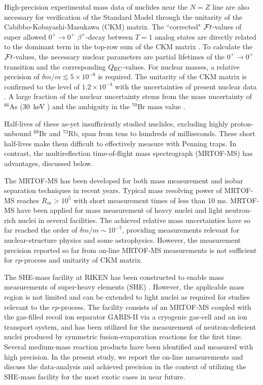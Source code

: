 \documentclass[3p]{elsarticle}
\begin{document}
High-precision experimental mass data of nuclides near the $N=Z$ line are also necessary for verification of the Standard Model through the unitarity of the Cabibbo-Kobayashi-Masukawa (CKM) matrix. The ``corrected" ${\cal F}t$-values of super allowed $0^{+} \rightarrow 0^{+}$ $\beta^{+}$-decay between $T = 1$ analog states are directly related to the dominant term in the top-row sum of the CKM matrix \citep{Towner2010}. To calculate the ${\cal F}t$-values, the necessary nuclear parameters are partial lifetimes of the $0^{+} \rightarrow 0^{+}$ transition  and the corresponding $Q_{\rm EC}$-values. For nuclear masses, a relative precision of $\delta m/m \lesssim 5 \times 10 ^{-8}$ is required. The unitarity of the CKM matrix is confirmed to the level of $1.2 \times 10^{-4}$ with the uncertainties of present nuclear data \citep{Hardy2015}. A large fraction of the nuclear uncertainty stems from the mass uncertainty of $^{66}$As (30~keV \citep{Schury2007}) and the ambiguity in the $^{70}$Br mass value \citep{Hardy2015, Savory2009}.

Half-lives of these as-yet insufficiently studied nuclides, excluding highly proton-unbound $^{69}$Br and $^{73}$Rb, span from tens to hundreds of milliseconds. These short half-lives make them difficult to effectively measure with Penning traps.  In contrast, the multireflection time-of-flight mass spectrograph (MRTOF-MS) has advantages, discussed below. 

The MRTOF-MS has been developed for both mass measurement and isobar separation techniques in recent years. Typical mass resolving power of MRTOF-MS reaches $R_m > 10^5$ with short measurement times of less than 10 ms. MRTOF-MS have been applied for mass measurement of heavy nuclei \cite{Schury2017,Ito2017submitted,Rosenbusch2018submitted} and light neutron-rich nuclei \cite{Wienholtz2013,Rosenbusch2015,Leistenschneider2017} in several facilities. The achieved relative mass uncertainties have so far reached the order of $\delta m/m \sim 10^{-7}$, providing measurements relevant for nuclear-structure physics and some astrophysics. However, the measurement precision reported so far from on-line MRTOF-MS measurements is not sufficient for $rp$-process and unitarity of CKM matrix. 

The SHE-mass facility at RIKEN has been constructed to enable mass measurements of super-heavy elements (SHE) \citep{Schury2017}. However, the applicable mass region is not limited and can be extended to light nuclei as required for studies relevant to the $rp$-process. The facility consists of an MRTOF-MS \citep{Schury2014} coupled with the gas-filled recoil ion separator GARIS-II \citep{Kaji2013} via a cryogenic gas-cell and an ion transport system, and has been utilized for the measurement of neutron-deficient nuclei produced by symmetric fusion-evaporation reactions for the first time. Several medium-mass reaction products have been identified and measured with high precision. In the present study, we report the on-line measurements and discuss the data-analysis and achieved precision in the context of utilizing the SHE-mass facility for the most exotic cases in near future.
 
\end{document}
